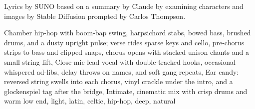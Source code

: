 
\begin{notes}
Lyrics by SUNO based on a summary by Claude by examining characters and images by Stable Diffusion prompted by Carlos Thompson.
\end{notes}
\begin{style}
Chamber hip-hop with boom-bap swing, harpsichord stabs, bowed bass, brushed drums, and a dusty upright pulse; verse rides sparse keys and cello, pre-chorus strips to bass and clipped snaps, chorus opens with stacked unison chants and a small string lift, Close-mic lead vocal with double-tracked hooks, occasional whispered ad-libs, delay throws on names, and soft gang repeats, Ear candy: reversed string swells into each chorus, vinyl crackle under the intro, and a glockenspiel tag after the bridge, Intimate, cinematic mix with crisp drums and warm low end, light, latin, celtic, hip-hop, deep, natural
\end{style}
